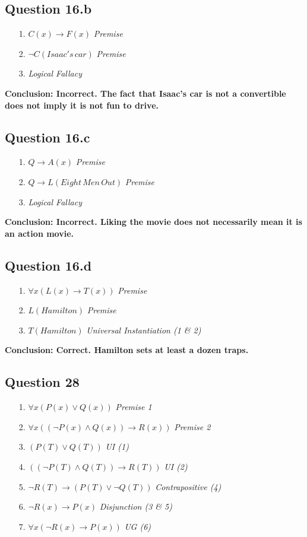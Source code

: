 \documentclass{article}
\begin{document}
\subsection*{Question 16.b}
\begin{itemize}
    \item[1.] \( C(x) \rightarrow F(x) \) \hfill \textit{Premise}
    \item[2.] \( \neg C(Isaac's\,car) \) \hfill \textit{Premise}
    \item[3.] \textit{Logical Fallacy}
\end{itemize}
\textbf{Conclusion: Incorrect. The fact that Isaac's car is not a convertible does not imply it is not fun to drive.}

\subsection*{Question 16.c}
\begin{itemize}
    \item[1.] \( Q \rightarrow A(x) \) \hfill \textit{Premise}
    \item[2.] \( Q \rightarrow L(Eight\,Men\,Out) \) \hfill \textit{Premise}
    \item[3.] \textit{Logical Fallacy}
\end{itemize}
\textbf{Conclusion: Incorrect. Liking the movie does not necessarily mean it is an action movie.}

\subsection*{Question 16.d}
\begin{itemize}
    \item[1.] \( \forall x (L(x) \rightarrow T(x)) \) \hfill \textit{Premise}
    \item[2.] \( L(Hamilton) \) \hfill \textit{Premise}
    \item[3.] \( T(Hamilton) \) \hfill \textit{Universal Instantiation (1 \& 2)}
\end{itemize}
\textbf{Conclusion: Correct. Hamilton sets at least a dozen traps.}

\subsection*{Question 28}
\begin{itemize}
    \item[1.] \( \forall x (P(x) \lor Q(x)) \) \hfill \textit{Premise 1}
    \item[2.] \( \forall x ((\neg P(x) \land Q(x)) \rightarrow R(x)) \) \hfill \textit{Premise 2}
    \item[3.] \( (P(T) \lor Q(T)) \) \hfill \textit{UI (1)}
    \item[4.] \( ((\neg P(T) \land Q(T)) \rightarrow R(T)) \) \hfill \textit{UI (2)}
    \item[5.] \( \neg R(T) \rightarrow (P(T) \lor \neg Q(T)) \) \hfill \textit{Contrapositive (4)}
    \item[6.] \( \neg R(x) \rightarrow P(x) \) \hfill \textit{Disjunction (3 \& 5)}
    \item[7.] \( \forall x (\neg R(x) \rightarrow P(x)) \) \hfill \textit{UG (6)}
\end{itemize}
\end{document}
